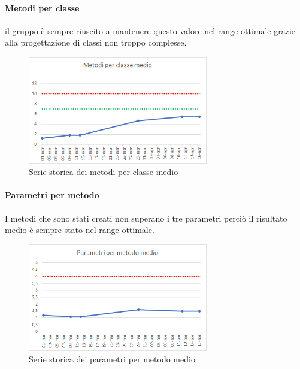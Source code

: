     \paragraph{Metodi per classe} \Spazio
    il gruppo è sempre riuscito a mantenere questo valore nel range ottimale grazie alla progettazione di classi non troppo complesse.
    \begin{figure}[H]
    	\centering 
    	\includegraphics[width=0.7\textwidth]{Images/metodi.png}
    	\caption{Serie storica dei metodi per classe medio}
    	\label{metodi} 
    \end{figure}
    \paragraph{Parametri per metodo} \Spazio
    I metodi che sono stati creati non superano i tre parametri perciò il risultato medio è sempre stato nel range ottimale.
    \begin{figure}[H]
    	\centering 
    	\includegraphics[width=0.7\textwidth]{Images/parametri.png}
    	\caption{Serie storica dei parametri per metodo medio}
    	\label{parametri} 
    \end{figure}
